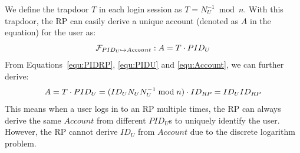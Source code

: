  We define the trapdoor $T$ in each login session as $T = N_U^{-1} \bmod n$. 
With this trapdoor, the RP can easily derive a unique account (denoted as $A$ in the equation) for the user as:%
\begin{equation}
\setlength{\abovedisplayskip}{3pt}
\setlength{\belowdisplayskip}{3pt}
   \mathcal{F}_{PID_{U} \mapsto Account}: A = {T} \cdot {PID_U}
   \label{equ:Account}
\end{equation}
From Equations~\ref{equ:PIDRP}, \ref{equ:PIDU} and \ref{equ:Account}, we can further derive:
\begin{equation*}
\setlength{\abovedisplayskip}{3pt}
\setlength{\belowdisplayskip}{3pt}
   A =  {T} \cdot {PID_{U}}
   = {(ID_U N_U N_U^{-1} \bmod n)} \cdot {ID_{RP}}
   = {ID_U}{ID_{RP}}
   \label{equ:AccountNotChanged}
\end{equation*}
This means when a user logs in to an RP multiple times, the RP can always derive the same $Account$ from different $PID_U$s to uniquely identify the user. However, the RP cannot derive $ID_U$ from $Account$ due to the discrete logarithm problem. 

